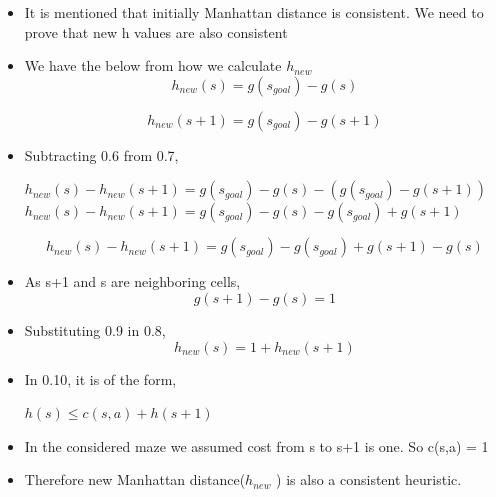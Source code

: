 \documentclass[a4 paper]{article}
\begin{document}
\begin{itemize}
    \item It is mentioned that initially Manhattan distance is consistent. We need to prove that new h values are also consistent
    
    \item We have the below from how we calculate $h_{new}$ \\
    \begin{equation}
        h_{new}(s) = g(s_{goal}) - g(s)
    \end{equation}
    
    \begin{equation}
        h_{new}(s+1) = g(s_{goal}) - g(s+1)
    \end{equation} 

    \item Subtracting 0.6 from 0.7,
        \begin{center}
            $h_{new}(s) - h_{new}(s+1) = g(s_{goal}) - g(s) - (g(s_{goal}) - g(s+1))$ 
            $h_{new}(s) - h_{new}(s+1) = g(s_{goal}) - g(s) - g(s_{goal}) + g(s+1)$
        \end{center}
        \vspace{-10pt}
        \begin{equation}
            h_{new}(s) - h_{new}(s+1) = g(s_{goal}) - g(s_{goal}) + g(s + 1) - g(s)
        \end{equation}
    \item As s+1 and s are neighboring cells, 
        \begin{equation}
            g(s+1) - g(s) = 1
        \end{equation}
    \item Substituting 0.9 in 0.8,
        \begin{equation}
            h_{new}(s) =  1 + h_{new}(s+1)
        \end{equation}
    \item In 0.10, it is of the form, 
        \begin{center}
            $h(s) \leq c(s, a) + h(s+1)$ \\
        \end{center}
    \item In the considered maze we assumed cost from s to s+1 is one. So c(s,a) = 1
    \item Therefore new Manhattan distance($h_{new}$ ) is also a consistent heuristic.
    
    

\end{itemize}
\end{document}
